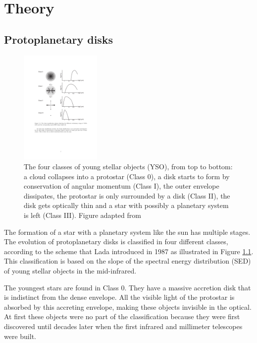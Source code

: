 \documentclass[twoside,single,12pt]{lion-msc}
\begin{document}
\chapter{Theory}
\section{Protoplanetary disks}
\begin{figure}
\vspace{-3mm}
\includegraphics[trim={4cm 11cm 11cm 4cm},clip,width = 0.35\textwidth]{classscheme}
\caption{The four classes of young stellar objects (YSO), from top to bottom: a cloud collapses into a protostar (Class 0), a disk starts to form by conservation of angular momentum (Class I), the outer envelope dissipates, the protostar is only surrounded by a disk (Class II), the disk gets optically thin and a star with possibly a planetary system is left (Class III). Figure adapted from\citep{Armitage2010}}
\vspace{-65pt}
\label{fig:classscheme}
\end{figure}%

The formation of a star with a planetary system like the sun has multiple stages.  The evolution of protoplanetary disks is classified in four different classes, according to the scheme that Lada introduced in 1987\cite{Lada1987} as illustrated in Figure \ref{fig:classscheme}. This classification is based on the slope of the spectral energy distribution (SED) of young stellar objects in the mid-infrared.
\bigskip

The youngest stars are found in Class 0. They have a massive accretion disk that is indistinct from the dense envelope. All the visible light of the protostar is absorbed by this accreting envelope, making these objects invisible in the optical. At first these objects were no part of the classification because they were first discovered until decades later when the first infrared and millimeter telescopes were built.
\bigskip
\end{document}
